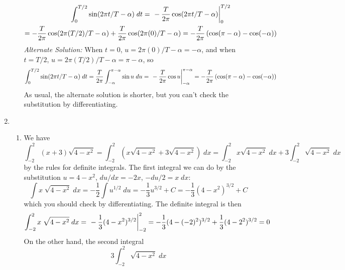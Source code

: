 \documentclass{article}
\begin{document}
\begin{enumerate}
\begin{enumerate}
    \begin{multline*}
      \int_0^{T/2} \sin(2\pi t/T - \alpha) \; dt
      = \left. \vphantom{\int} -\frac{T}{2\pi} \cos (2\pi t/T -
        \alpha) \right|_0^{T/2}
      \\
      = -\frac{T}{2\pi} \cos (2\pi (T/2)/T - \alpha)
      +\frac{T}{2\pi} \cos (2\pi (0)/T - \alpha)
      = -\frac{T}{2\pi} \left(\cos (\pi-\alpha) - \cos(-\alpha)\right)
    \end{multline*}
    \emph{Alternate Solution:} When $t=0$, $u=2\pi
    (0)/T-\alpha=-\alpha$, and when $t=T/2$, $u=2\pi (T/2) / T -
    \alpha = \pi-\alpha$, so
    \begin{equation*}
      \int_0^{T/2} \sin(2\pi t/T - \alpha) \; dt
      =\frac{T}{2\pi} \int_{-\alpha}^{\pi-\alpha} \sin u \; du
      = \left. \vphantom{\int} -\frac{T}{2\pi} \cos u
      \right|_{-\alpha}^{\pi-\alpha}
      = -\frac{T}{2\pi} \left(\cos(\pi-\alpha) - \cos(-\alpha) \right)
    \end{equation*}
    As usual, the alternate solution is shorter, but you can't check
    the substitution by differentiating.
  \end{enumerate}
\item
  \begin{enumerate}
  \item We have
    \begin{equation*}
      \int_{-2}^2 (x+3) \sqrt{4-x^2}
      = \int_{-2}^2 \left( x\sqrt{4-x^2} + 3 \sqrt{4-x^2} \right) \;
      dx
      = \int_{-2}^2 x\sqrt{4-x^2} \; dx + 3 \int_{-2}^2 \sqrt{4-x^2}
      \; dx
    \end{equation*}
    by the rules for definite integrals.  The first integral we can do
    by the substitution $u=4-x^2$, $du/dx = -2x$, $-du/2 = x \; dx$:
    \begin{equation*}
      \int x \; \sqrt{4-x^2} \; dx
      = -\frac{1}{2} \int u^{1/2} \; du
      = -\frac{1}{3} u^{3/2} + C
      = -\frac{1}{3} (4-x^2)^{3/2} + C
    \end{equation*}
    which you should check by differentiating.  The definite integral
    is then
    \begin{equation*}
      \int_{-2}^2 x \; \sqrt{4-x^2} \; dx
      = \left. \vphantom{\int} -\frac{1}{3} (4-x^2)^{3/2}
      \right|_{-2}^2
      = -\frac{1}{3}(4-(-2)^2)^{3/2} + \frac{1}{3} (4-2^2)^{3/2}
      = 0
    \end{equation*}
    On the other hand, the second integral
    \begin{equation*}
      3\int_{-2}^2 \sqrt{4-x^2} \; dx

\end{equation*}
\end{enumerate}
\end{enumerate}
\end{document}
